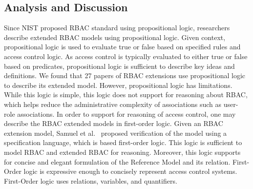 \subsection{Analysis and Discussion}

Since NIST proposed RBAC standard using propositional logic, researchers describe extended RBAC models using propositional logic. Given context, propositional logic is used to evaluate true or false based on specified rules and access control logic. As access control is typically evaluated to either true or false based on predicates, propositional logic is sufficient to describe key ideas and definitions. We found that 27 papers of RBAC extensions use propositional logic to describe its extended model.
However, propositional logic has limitations. While this logic is simple, this logic does not support for reasoning about RBAC, which helps
reduce the administrative complexity of associations such as user- role associations.
In order to support for reasoning of access control, one may describe the RBAC extended models in first-order logic. 
Given an RBAC extension model, Samuel et al.~\cite{samuel07:spatio-temporal} proposed verification of the model using a specification language, which is based first-order logic. This logic is sufficient to model RBAC and extended RBAC for reasoning. Moreover, this logic supports for concise and elegant formulation of the Reference Model and its relation.  First-Order logic is expressive enough to concisely represent access control systems. First-Order logic uses relations, variables, and quantifiers.